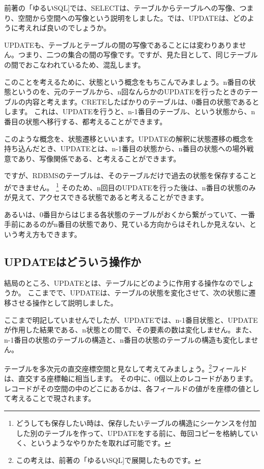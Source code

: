前著の「ゆるいSQL]では、SELECTは、テーブルからテーブルへの写像、つまり、空間から空間への写像という説明をしました。では、UPDATEは、どのように考えれば良いのでしょうか。

UPDATEも、テーブルとテーブルの間の写像であることには変わりありません。つまり、二つの集合の間の写像です。ですが、見た目として、同じテーブルの間でおこなわれているため、混乱します。

このことを考えるために、状態という概念をもちこんでみましょう。n番目の状態というのを、元のテーブルから、n回なんらかのUPDATEを行ったときのテーブルの内容と考えます。CRETEしたばかりのテーブルは、0番目の状態であるとします。
これは、UPDATEを行うと、n-1番目のテーブル、という状態から、n番目の状態へ移行する、都考えることができます。

このような概念を、状態遷移といいます。UPDATEの解釈に状態遷移の概念を持ち込んだとき、UPDATEとは、n-1番目の状態から、n番目の状態への場外戦意であり、写像関係である、と考えることができます。

ですが、RDBMSのテーブルは、そのテーブルだけで過去の状態を保存することができません。
\footnote{どうしても保存したい時は、保存したいテーブルの構造にシーケンスを付加した別のテーブルを作って、UPDATEをする前に、毎回コピーを格納していく、というようなやりかたを取れば可能です。}
そのため、n回目のUPDATEを行った後は、n番目の状態のみが見えて、アクセスできる状態であると考えることができます。

あるいは、0番目からはじまる各状態のテーブルがおくから繋がっていて、一番手前にあるのがn番目の状態であり、見ている方向からはそれしか見えない、という考え方もできます。

\subsection{UPDATEはどういう操作か}

結局のところ、UPDATEとは、テーブルにどのように作用する操作なのでしょうか。
ここまでで、UPDATEは、テーブルの状態を変化させて、次の状態に遷移させる操作として説明しました。

ここまで明記していませんでしたが、UPDATEでは、n-1番目状態と、UPDATEが作用した結果である、n状態との間で、その要素の数は変化しません。また、n-1番目の状態のテーブルの構造と、n番目の状態のテーブルの構造も変化しません。

テーブルを多次元の直交座標空間と見なして考えてみましょう。\footnote{この考えは、前著の「ゆるいSQL]で展開したものです。}フィールドは、直交する座標軸に相当します。
その中に、0個以上のレコードがあります。レコードがその空間の中のどこにあるかは、各フィールドの値がを座標の値として考えることで現されます。

